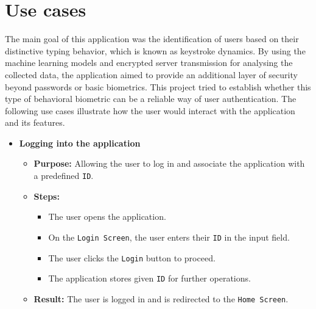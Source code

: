 
\section{Use cases}
The main goal of this application was the identification of users based on their distinctive typing behavior, which is known as keystroke dynamics. By using the machine learning models and encrypted server transmission for analysing the collected data, the application aimed to provide an additional layer of security beyond passwords or basic biometrics. This project tried to establish whether this type of behavioral biometric can be a reliable way of user authentication. \newline
The following use cases illustrate how the user would interact with the application and its features.

\begin{itemize}
	\item \textbf{Logging into the application}
	\begin{itemize}
		\item \textbf{Purpose:} Allowing the user to log in and associate the application with a predefined \texttt{ID}.
		\item \textbf{Steps:}
		\begin{itemize}
			\item The user opens the application.
			\item On the \texttt{Login Screen}, the user enters their \texttt{ID} in the input field.
			\item The user clicks the \texttt{Login} button to proceed.
			\item The application stores given \texttt{ID} for further operations.
		\end{itemize}
		\item \textbf{Result:} The user is logged in and is redirected to the \texttt{Home Screen}.
	\end{itemize}
	

\end{itemize}

